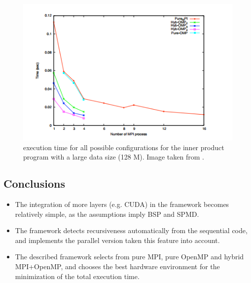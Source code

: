 \documentclass[paper=a4, fontsize=11pt]{scrartcl} %
\numberwithin{equation}{section} %
\numberwithin{figure}{section} %
\numberwithin{table}{section} %
\begin{document}
\begin{figure}
\centering
\includegraphics[width=0.8\linewidth]{results-plots2.png}
\caption{execution time for all possible configurations for the inner product program with a large data size (128 M). Image taken from \cite{hamidouche}.} \label{fig:results2}
\end{figure}



\subsection{Conclusions}

\begin{itemize}
\item The integration of more layers (e.g. CUDA) in the framework becomes relatively simple, as the assumptions imply BSP and SPMD.
\item The framework detects recursiveness automatically from the sequential code, and implements the parallel version taken this feature into account.
\item The described framework selects from pure MPI, pure OpenMP and hybrid MPI+OpenMP, and chooses the best hardware environment for the minimization of the total execution time.
\end{itemize}





\newpage
\end{document}
